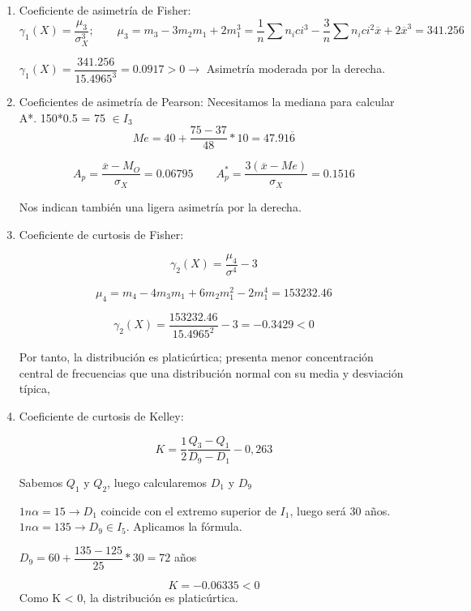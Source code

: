 \begin{enumerate}
	\item Coeficiente de asimetría de Fisher:
	$$\gamma_1(X) = \dfrac{\mu_3}{\sigma_X^3};\qquad
	\mu_3 = m_3 - 3m_2m_1 + 2m_1^3 = \dfrac{1}{n}\sum n_i ci^3 - \dfrac{3}{n}
	\sum n_i ci^2\overline{x}  + 2\overline{x}^3 = 341.256$$
    
    $\gamma_1(X) = \dfrac{341.256}{15.4965^3} = 0.0917 > 0 \longrightarrow $ Asimetría moderada por la derecha.

	\item Coeficientes de asimetría de Pearson:
	Necesitamos la mediana para calcular A*. 150*0.5 = 75 $\in I_3$
	$$Me = 40 + \dfrac{75-37}{48}*10 = 47.91\overline{6}$$

	$$A_p = \dfrac{\overline{x}- M_O}{\sigma_X} = 0.06795 \qquad A_p^* = \dfrac{3(\overline{x}- Me)}{\sigma_X} = 0.1516$$
    
    Nos indican también una ligera asimetría por la derecha.

	\item Coeficiente de curtosis de Fisher:

	$$\gamma_2(X) = \dfrac{\mu_4}{\sigma^4} - 3$$
    
    $$\mu_4 = m_4 - 4m_3m_1 + 6m_2m_1^2 - 2m_1^4 = 153232.46$$
    
    $$\gamma_2(X) = \dfrac{153232.46}{15.4965^2} - 3 = -0.3429 < 0$$
	
	Por tanto, la distribución es platicúrtica; presenta menor concentración central de frecuencias que una distribución normal con su media y desviación típica,
	
	\item Coeficiente de curtosis de Kelley:
	
	$$K = \dfrac{1}{2} \dfrac{Q_3 - Q_1}{D_9 - D_1}- 0,263$$
	
	Sabemos $Q_1$ y $Q_2$, luego calcularemos $D_1$ y $D_9$
	
	$1n\alpha = 15 \longrightarrow D_1$ coincide con el extremo superior de $I_1$, luego será 30 años.
	$1n\alpha = 135 \longrightarrow D_9 \in I_5$. Aplicamos la fórmula.
	\begin{center}
	    $ D_9 = 60 + \dfrac{135- 125}{25}*30 = 72 $ años
	\end{center}
	 $$ K = -0.06335 < 0 $$
Como K < 0, la distribución es platicúrtica.
\end{enumerate}




